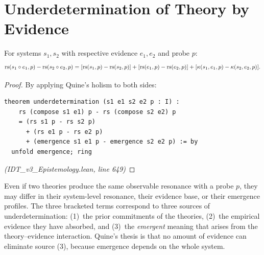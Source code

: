 \section{Underdetermination of Theory by Evidence}

\begin{theorem}[Underdetermination]
\label{thm:underdetermination}
For systems $s_1, s_2$ with respective evidence $e_1, e_2$ and probe $p$:
\[
  \mathrm{rs}(s_1 \circ e_1, p) - \mathrm{rs}(s_2 \circ e_2, p) = [\mathrm{rs}(s_1, p) - \mathrm{rs}(s_2, p)] + [\mathrm{rs}(e_1, p) - \mathrm{rs}(e_2, p)] + [\kappa(s_1, e_1, p) - \kappa(s_2, e_2, p)].
\]
\end{theorem}

\begin{proof}
By applying Quine's holism to both sides:
\begin{lstlisting}
theorem underdetermination (s1 e1 s2 e2 p : I) :
    rs (compose s1 e1) p - rs (compose s2 e2) p
    = (rs s1 p - rs s2 p)
      + (rs e1 p - rs e2 p)
      + (emergence s1 e1 p - emergence s2 e2 p) := by
  unfold emergence; ring
\end{lstlisting}
\textit{(IDT\_v3\_Epistemology.lean, line 649)}
\end{proof}

\begin{interpretation}
Even if two theories produce the same observable resonance with a probe $p$,
they may differ in their system-level resonance, their evidence base, or their
emergence profiles. The three bracketed terms correspond to three sources of
underdetermination: (1)~the prior commitments of the theories, (2)~the
empirical evidence they have absorbed, and (3)~the \emph{emergent} meaning
that arises from the theory--evidence interaction. Quine's thesis is that
no amount of evidence can eliminate source (3), because emergence depends on
the whole system.
\end{interpretation}

